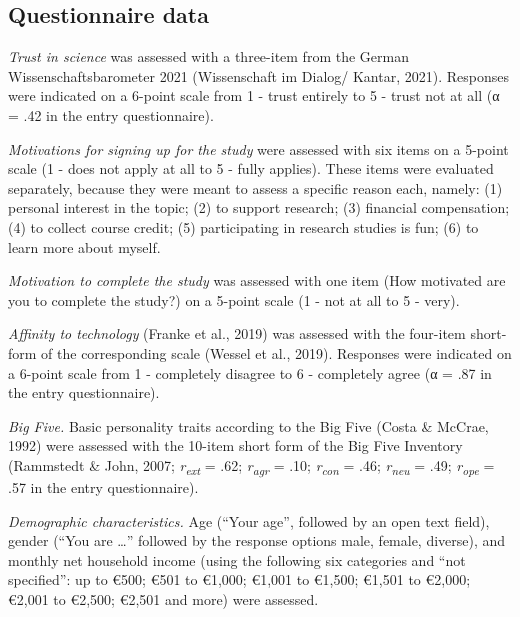 \documentclass[authordate, empirical]{jote-new-article}
\begin{document}
	\subsection{Questionnaire data}



	\emph{Trust in science} was assessed with a three-item from the German Wissenschaftsbarometer 2021 (Wissenschaft im Dialog/ Kantar, 2021). Responses were indicated on a 6-point scale from 1 - trust entirely to 5 - trust not at all (α = .42 in the entry questionnaire).



	\emph{Motivations for signing up for the study }were assessed with six items on a 5-point scale (1 - does not apply at all to 5 - fully applies). These items were evaluated separately, because they were meant to assess a specific reason each, namely: (1) personal interest in the topic; (2) to support research; (3) financial compensation; (4) to collect course credit; (5) participating in research studies is fun; (6) to learn more about myself.



	\emph{Motivation to complete the study }was assessed with one item (How motivated are you to complete the study?) on a 5-point scale (1 - not at all to 5 - very).



	\emph{Affinity to technology} (Franke et al., 2019) was assessed with the four-item short-form of the corresponding scale (Wessel et al., 2019). Responses were indicated on a 6-point scale from 1 - completely disagree to 6 - completely agree (α = .87 in the entry questionnaire).



	\emph{Big Five. }Basic personality traits according to the Big Five (Costa \& McCrae, 1992) were assessed with the 10-item short form of the Big Five Inventory (Rammstedt \& John, 2007;\emph{ r}\textsubscript{\emph{ext}} = .62;\emph{ r}\textsubscript{\emph{agr}} = .10; \emph{r}\textsubscript{\emph{con}} = .46;\emph{ r}\textsubscript{\emph{neu}} = .49;\emph{ r}\textsubscript{\emph{ope}} = .57 in the entry questionnaire).



	\emph{Demographic characteristics.} Age (“Your age”, followed by an open text field), gender (“You are …” followed by the response options male, female, diverse), and monthly net household income (using the following six categories and “not specified”: up to €500; €501 to €1,000; €1,001 to €1,500; €1,501 to €2,000; €2,001 to €2,500; €2,501 and more) were assessed.
\end{document}
